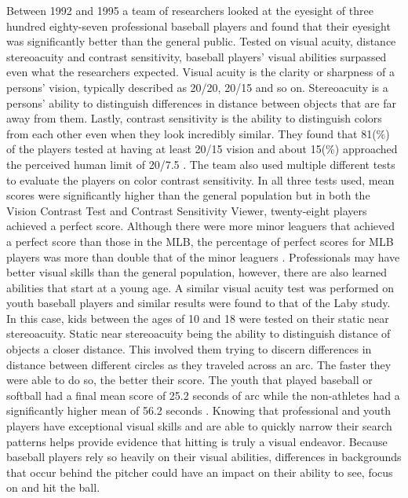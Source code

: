 \documentclass{article}
\begin{document}
\begin{doublespace}
Between 1992 and 1995 a team of researchers looked at the eyesight of three hundred eighty-seven professional baseball players and found that their eyesight was significantly better than the general public. Tested on visual acuity, distance stereoacuity and contrast sensitivity, baseball players’ visual abilities surpassed even what the researchers expected. Visual acuity is the clarity or sharpness of a persons’ vision, typically described as 20/20, 20/15 and so on. Stereoacuity is a persons’ ability to distinguish differences in distance between objects that are far away from them. Lastly, contrast sensitivity is the ability to distinguish colors from each other even when they look incredibly similar. They found that 81(\%) of the players tested at having at least 20/15 vision and about 15(\%) approached the perceived human limit of 20/7.5 \citep{Laby}. The team also used multiple different tests to evaluate the players on color contrast sensitivity. In all three tests used, mean scores were significantly higher than the general population but in both the Vision Contrast Test and Contrast Sensitivity Viewer, twenty-eight players achieved a perfect score. Although there were more minor leaguers that achieved a perfect score than those in the MLB, the percentage of perfect scores for MLB players was more than double that of the minor leaguers \citep{Laby}. Professionals may have better visual skills than the general population, however, there are also learned abilities that start at a young age. A similar visual acuity test was performed on youth baseball players and similar results were found to that of the Laby study. In this case, kids between the ages of 10 and 18 were tested on their static near stereoacuity. Static near stereoacuity being the ability to distinguish distance of objects a closer distance. This involved them trying to discern differences in distance between different circles as they traveled across an arc. The faster they were able to do so, the better their score. The youth that played baseball or softball had a final mean score of 25.2 seconds of arc while the non-athletes had a significantly higher mean of 56.2 seconds \citep{Boden}. Knowing that professional and youth players have exceptional visual skills and are able to quickly narrow their search patterns helps provide evidence that hitting is truly a visual endeavor. Because baseball players rely so heavily on their visual abilities, differences in backgrounds that occur behind the pitcher could have an impact on their ability to see, focus on and hit the ball.   

\end{doublespace}
\end{document}
